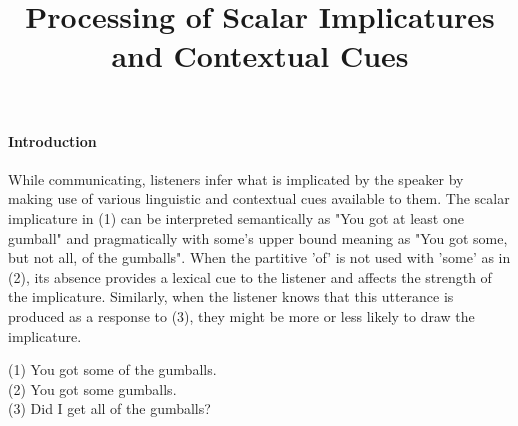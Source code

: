 \documentclass[12pt]{article}
\date{}
\begin{document}
\title{\vspace{-3.0cm}\normalsize \textbf{Processing of Scalar Implicatures and Contextual Cues}}
       
\maketitle
\vspace{-2.8cm}

\paragraph{Introduction} 
While communicating, listeners infer what is implicated by the speaker by making use of various linguistic and contextual cues available to them. The scalar implicature in (1) can be interpreted semantically as "You got at least one gumball" and pragmatically with some's upper bound meaning as "You got some, but not all, of the gumballs". When the partitive 'of' is not used with 'some' as in (2), its absence provides a lexical cue to the listener and affects the strength of the implicature. Similarly, when the listener knows that this utterance is produced as a response to (3), they might be more or less likely to draw the implicature. 

\indent (1) You got some of the gumballs.\\
\indent (2) You got some gumballs.\\
\indent (3) Did I get all of the gumballs?



\end{document}
